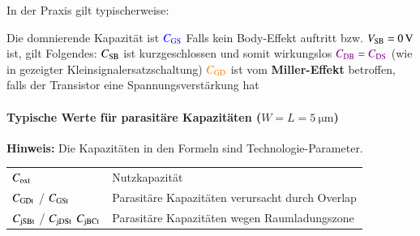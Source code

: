 In der Praxis gilt typischerweise:

\smallskip

\begin{outline}
    \1 Die domnierende Kapazität ist ${\color{blue} C_{\rm GS} }$
    \1 Falls kein Body-Effekt auftritt bzw. $V_{\rm SB} = \qty{0}{\volt}$ ist, gilt Folgendes:
        \2 $C_{\rm SB}$ ist kurzgeschlossen und somit wirkungslos
        \2 ${\color{violet} C_{\rm DB} = C_{\rm DS} }$ (wie in gezeigter Kleinsignalersatzschaltung)
    \1 ${\color{orange} C_{\rm GD} }$ ist vom \textbf{Miller-Effekt} betroffen, falls der Transistor eine Spannungsverstärkung hat
\end{outline}


\paragraph{Typische Werte für parasitäre Kapazitäten ($W = L = \qty{5}{\micro \meter}$)}


\medskip

\textbf{Hinweis:} Die Kapazitäten in den Formeln sind Technologie-Parameter.

\smallskip

\begin{tabular}{ll}
    $C_{\rm oxt}$                                   & Nutzkapazität                                     \\
    $C_{\rm GDt}$ / $C_{\rm GSt}$                   & Parasitäre Kapazitäten verursacht durch Overlap   \\
    $C_{\rm jSBt}$ / $C_{\rm jDSt}$ $C_{\rm jBCt}$  & Parasitäre Kapazitäten wegen Raumladungszone      \\
\end{tabular}


